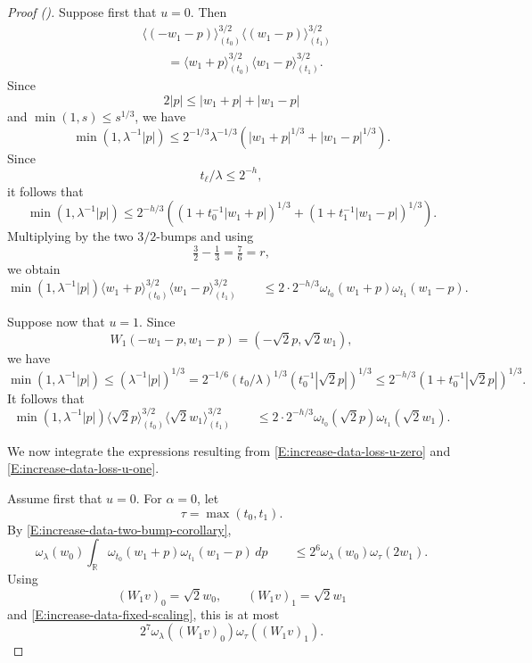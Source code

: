 \documentclass[12pt,reqno]{amsart}
\newcommand{\auto}{{({\tiny\faCar})}}
\theoremstyle{plain}
\numberwithin{equation}{section}
\theoremstyle{remark}
\begin{document}
\begin{proof}[Proof \auto]
Suppose first that \(u=0\). Then
\[
\begin{aligned}
&
\langle(-w_1-p)\rangle_{(t_0)}^{3/2}
\langle(w_1-p)\rangle_{(t_1)}^{3/2}
\\
&\qquad=
\langle w_1+p\rangle_{(t_0)}^{3/2}
\langle w_1-p\rangle_{(t_1)}^{3/2}.
\end{aligned}
\]
Since
\[
2|p|
\leq
|w_1+p|+|w_1-p|
\]
and \(\min(1,s)\leq s^{1/3}\), we have
\[
\min(1,\lambda^{-1}|p|)
\leq
2^{-1/3}\lambda^{-1/3}
\left(|w_1+p|^{1/3}+|w_1-p|^{1/3}\right).
\]
Since
\[
t_\ell/\lambda\leq2^{-h},
\]
it follows that
\[
\min(1,\lambda^{-1}|p|)
\leq
2^{-h/3}
\left((1+t_0^{-1}|w_1+p|)^{1/3}+(1+t_1^{-1}|w_1-p|)^{1/3}\right).
\]
Multiplying by the two \(3/2\)-bumps and using
\[
\tfrac32-\tfrac13=\tfrac76=r,
\]
we obtain
\begin{equation}
    \label{E:increase-data-loss-u-zero}
    \min(1,\lambda^{-1}|p|) \langle w_1+p\rangle_{(t_0)}^{3/2} \langle w_1-p\rangle_{(t_1)}^{3/2} \qquad\leq 2 \cdot 2^{-h/3} \omega_{t_0}(w_1+p) \omega_{t_1}(w_1-p).
\end{equation}

Suppose now that \(u=1\). Since
\[
W_1(-w_1-p,w_1-p)
=
(-\sqrt2p,\sqrt2w_1),
\]
we have
\[
\min(1,\lambda^{-1}|p|) \leq (\lambda^{-1}|p|)^{1/3} = 2^{-1/6} (t_0/\lambda)^{1/3} (t_0^{-1}|\sqrt2p|)^{1/3} \leq 2^{-h/3} (1+t_0^{-1}|\sqrt2p|)^{1/3}.
\]
It follows that
\begin{equation}
    \label{E:increase-data-loss-u-one}
    \min(1,\lambda^{-1}|p|) \langle\sqrt2p\rangle_{(t_0)}^{3/2} \langle\sqrt2w_1\rangle_{(t_1)}^{3/2} \qquad\leq 2\cdot 2^{-h/3} \omega_{t_0}(\sqrt2p) \omega_{t_1}(\sqrt2w_1).
\end{equation}

We now integrate the expressions resulting from
\eqref{E:increase-data-loss-u-zero} and
\eqref{E:increase-data-loss-u-one}.

Assume first that \(u=0\). For \(\alpha=0\), let
\[
\tau=\max(t_0,t_1).
\]
By \eqref{E:increase-data-two-bump-corollary},
\[
\omega_\lambda(w_0) \int_{\mathbb R} \omega_{t_0}(w_1+p) \omega_{t_1}(w_1-p)\,dp \qquad\leq 2^6 \omega_\lambda(w_0) \omega_\tau(2w_1).
\]
Using
\[
(W_1v)_0=\sqrt2w_0,
\qquad
(W_1v)_1=\sqrt2w_1
\]
and \eqref{E:increase-data-fixed-scaling}, this is at most
\begin{equation}
    \label{E:increase-data-u0-alpha0}
    2^7
    \omega_\lambda((W_1v)_0)
    \omega_\tau((W_1v)_1).
\end{equation}


\end{proof}
\end{document}
